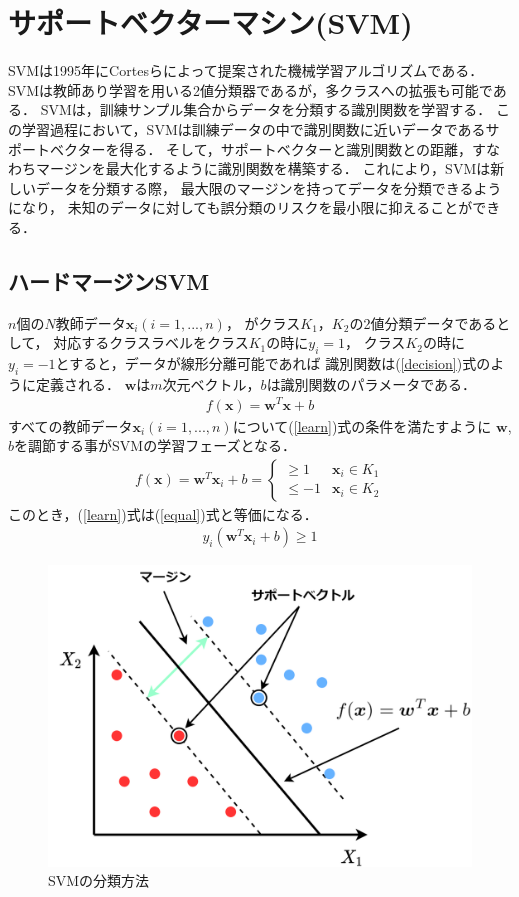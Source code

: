 \section{サポートベクターマシン(SVM)}
SVMは1995年にCortesらによって提案された機械学習アルゴリズムである\cite{svm}．
SVMは教師あり学習を用いる2値分類器であるが，多クラスへの拡張も可能である．
SVMは，訓練サンプル集合からデータを分類する識別関数を学習する．
この学習過程において，SVMは訓練データの中で識別関数に近いデータであるサポートベクターを得る．
そして，サポートベクターと識別関数との距離，すなわちマージンを最大化するように識別関数を構築する．
これにより，SVMは新しいデータを分類する際，
最大限のマージンを持ってデータを分類できるようになり，
未知のデータに対しても誤分類のリスクを最小限に抑えることができる．
\subsection{ハードマージンSVM}
$n$個の$N$教師データ$\boldsymbol{x}_i(i=1,...,n)$，
がクラス$K_1$，$K_2$の2値分類データであるとして，
対応するクラスラベルをクラス$K_1$の時に$y_i= 1$，
クラス$K_2$の時に$y_i= -1$とすると，データが線形分離可能であれば
識別関数は(\ref{decision})式のように定義される．
 $\boldsymbol{w}$は$m$次元ベクトル，$b$は識別関数のパラメータである．
\begin{align}
    \label{decision}
f(\boldsymbol{x}) = \boldsymbol{w}^T \boldsymbol{x} + b
\end{align}
すべての教師データ$\boldsymbol{x}_i(i=1,...,n)$について(\ref{learn})式の条件を満たすように
$\boldsymbol{w}$, $b$を調節する事がSVMの学習フェーズとなる．
\begin{align}
    \label{learn}
    f(\boldsymbol{x}) = \boldsymbol{w}^T \boldsymbol{x}_i + b =
    \begin{cases}
        \geq 1&  \boldsymbol{x}_i \in K_1 \\
        \leq  -1& \boldsymbol{x}_i \in K_2
    \end{cases}
\end{align}
このとき，(\ref{learn})式は(\ref{equal})式と等価になる．
\begin{align}
    \label{equal}
    y_i(\boldsymbol{w}^T \boldsymbol{x}_i + b) \geq 1
\end{align}
\begin{figure}
    \centering
    \includegraphics[width=0.6\linewidth]{svm_support.png}
    \caption{SVMの分類方法}
    \label{svm_support}
\end{figure}
